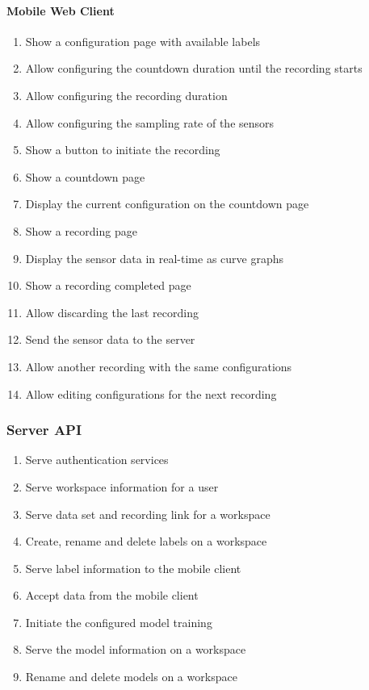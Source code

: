 \paragraph{Mobile Web Client}
\begin{enumerate}[resume*]
    \item Show a configuration page with available labels
    \item Allow configuring the countdown duration until the recording starts
    \item Allow configuring the recording duration
    \item Allow configuring the sampling rate of the sensors
    \item Show a button to initiate the recording
    \item Show a countdown page
    \item Display the current configuration on the countdown page
    \item Show a recording page
    \item Display the sensor data in real-time as curve graphs
    \item Show a recording completed page
    \item Allow discarding the last recording
    \item Send the sensor data to the server
    \item Allow another recording with the same configurations
    \item Allow editing configurations for the next recording
\end{enumerate}

\subsubsection{Server API}
\begin{enumerate}[resume*]
    \item Serve authentication services
    \item Serve workspace information for a user
    \item Serve data set and recording link for a workspace
    \item Create, rename and delete labels on a workspace
    \item Serve label information to the mobile client
    \item Accept data from the mobile client
    \item Initiate the configured model training
    \item Serve the model information on a workspace
    \item Rename and delete models on a workspace
\end{enumerate}

